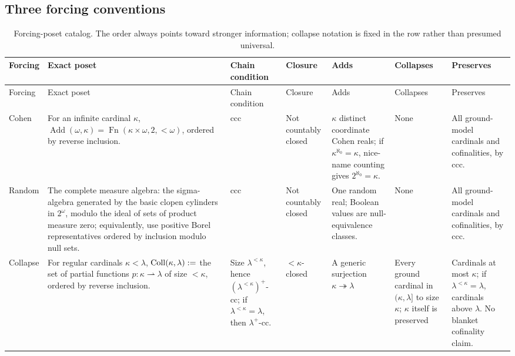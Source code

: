 \begin{landscape}
\subsection{Three forcing conventions}
\scriptsize
\setlength{\tabcolsep}{2.5pt}
\begin{longtable}{@{}p{.58in}p{1.78in}p{.58in}p{.68in}p{1.00in}
  p{1.00in}p{1.42in}@{}}
\caption{Forcing-poset catalog.  The order always points
toward stronger information; collapse notation is fixed in the row rather
than presumed universal.}\label{tab:p06-forcing-catalog}\\
\toprule
Forcing & Exact poset & Chain condition & Closure & Adds & Collapses & Preserves \\
\midrule
\endfirsthead
\toprule
Forcing & Exact poset & Chain condition & Closure & Adds & Collapses & Preserves \\
\midrule
\endhead
Cohen
& For an infinite cardinal \(\kappa\),
  \(\operatorname{Add}(\omega,\kappa)
    =\operatorname{Fn}(\kappa\times\omega,2,{<}\omega)\), ordered by reverse
  inclusion.
& ccc
& Not countably closed
& \(\kappa\) distinct coordinate Cohen reals; if
  \(\kappa^{\aleph_0}=\kappa\), nice-name counting gives
  \(2^{\aleph_0}=\kappa\).
& None
& All ground-model cardinals and cofinalities, by ccc. \\
\addlinespace
Random
& The complete measure algebra: the sigma-algebra generated by the basic
  clopen cylinders in \(2^\omega\), modulo the ideal of sets of product
  measure zero; equivalently, use positive Borel representatives ordered by
  inclusion modulo null sets.
& ccc
& Not countably closed
& One random real; Boolean values are null-equivalence classes.
& None
& All ground-model cardinals and cofinalities, by ccc. \\
\addlinespace
Collapse
& For regular cardinals \(\kappa<\lambda\),
  \(\operatorname{Coll}(\kappa,\lambda)\mathrel{:=}\) the set of partial functions
  \(p:\kappa\rightharpoonup\lambda\) of size \(<\kappa\), ordered by reverse
  inclusion.
& Size \(\lambda^{<\kappa}\), hence
  \((\lambda^{<\kappa})^+\)-cc; if \(\lambda^{<\kappa}=\lambda\), then
  \(\lambda^+\)-cc.
& \({<}\kappa\)-closed
& A generic surjection \(\kappa\twoheadrightarrow\lambda\)
& Every ground cardinal in \((\kappa,\lambda]\) to size \(\kappa\);
  \(\kappa\) itself is preserved
& Cardinals at most \(\kappa\); if \(\lambda^{<\kappa}=\lambda\), cardinals
  above \(\lambda\).  No blanket cofinality claim. \\
\bottomrule
\end{longtable}
\end{landscape}
\endgroup

